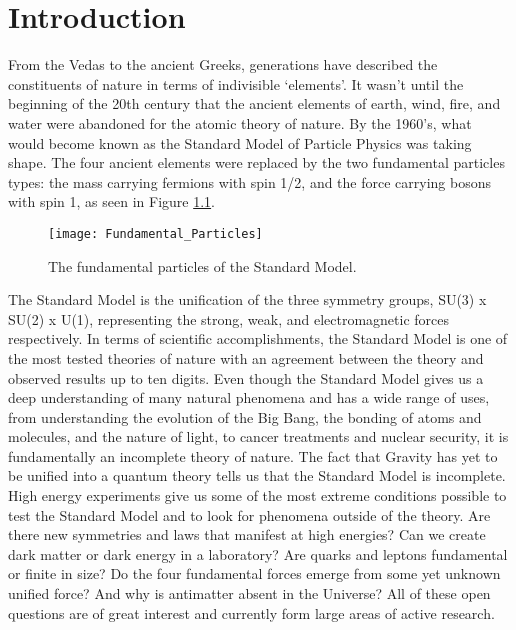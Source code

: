 \chapter{Introduction} \label{ch:introduction}

From the Vedas to the ancient Greeks, generations have described the constituents of nature in terms of indivisible `elements'.  It wasn't until the beginning of the 20th century that the ancient elements of earth, wind, fire, and water were abandoned for the atomic theory of nature.  By the 1960's, what would become known as the Standard Model of Particle Physics was taking shape.  The four ancient elements were replaced by the two fundamental particles types: the mass carrying fermions with spin 1/2, and the force carrying bosons with spin 1, as seen in Figure \ref{fig:fundpart}.


\begin{figure}[h]
\texttt{[image: Fundamental\_Particles]}
\centering
\caption{The fundamental particles of the Standard Model\cite{Patrignani:2016xqp}.}
\label{fig:fundpart}
\end{figure}


\par
The Standard Model is the unification of the three symmetry groups, SU(3) x SU(2) x U(1), representing the strong, weak, and electromagnetic forces respectively\cite{Langacker:2009my}.  In terms of scientific accomplishments, the Standard Model is one of the most tested theories of nature with an agreement between the theory and observed results up to ten digits\cite{Aoyama:2014sxa}.  Even though the Standard Model gives us a deep understanding of many natural phenomena and has a wide range of uses, from understanding the evolution of the Big Bang, the bonding of atoms and molecules, and the nature of light, to cancer treatments and nuclear security, it is fundamentally an incomplete theory of nature.  The fact that Gravity has yet to be unified into a quantum theory tells us that the Standard Model is incomplete.  High energy experiments give us some of the most extreme conditions possible to test the Standard Model and to look for phenomena outside of the theory.  Are there new symmetries and laws that manifest at high energies? Can we create dark matter or dark energy in a laboratory?  Are quarks and leptons fundamental or finite in size?  Do the four fundamental forces emerge from some yet unknown unified force?  And why is antimatter absent in the Universe?  All of these open questions are of great interest and currently form large areas of active research.  

